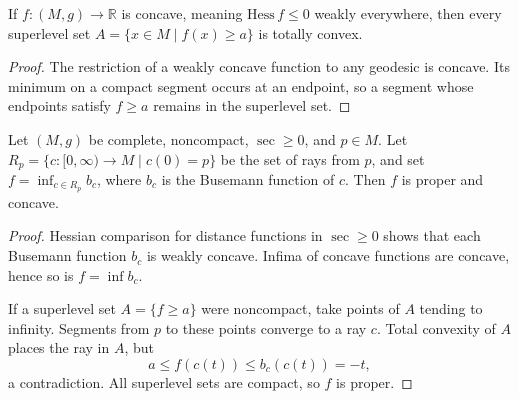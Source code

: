 \begin{lemma}
  \label{lem:pet-ch12-concave-superlevel-convex}

  If $f:(M,g)\to\mathbb{R}$ is concave, meaning $\mathrm{Hess}\,f\le0$ weakly
  everywhere, then every superlevel set $A=\{x\in M\mid f(x)\ge a\}$ is totally
  convex.
\end{lemma}
\begin{proof}
  \sketch
  The restriction of a weakly concave function to any geodesic is concave.
  Its minimum on a compact segment occurs at an endpoint, so a segment whose
  endpoints satisfy \(f\ge a\) remains in the superlevel set.
\end{proof}

\begin{lemma}
  \label{lem:pet-ch12-busemann-proper-concave}

  Let $(M,g)$ be complete, noncompact, $\sec\ge0$, and $p\in M$. Let
  $R_p=\{c:[0,\infty)\to M\mid c(0)=p\}$ be the set of rays from $p$, and set
  $f=\inf_{c\in R_p}b_c$, where $b_c$ is the Busemann function of $c$. Then $f$
  is proper and concave.
\end{lemma}
\begin{proof}
  \sketch
  Hessian comparison for distance functions in \(\sec\ge0\) shows that each
  Busemann function \(b_c\) is weakly concave. Infima of concave functions are
  concave, hence so is \(f=\inf b_c\).

  If a superlevel set \(A=\{f\ge a\}\) were noncompact, take points of \(A\)
  tending to infinity. Segments from \(p\) to these points converge to a ray
  \(c\). Total convexity of \(A\) places the ray in \(A\), but
  \[ a\le f(c(t))\le b_c(c(t))=-t, \]
  a contradiction. All superlevel sets are compact, so \(f\) is proper.
\end{proof}


